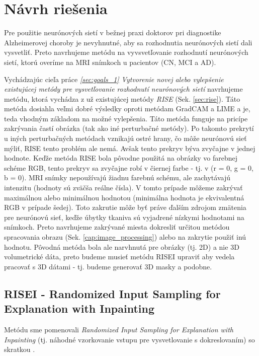 \chapter{Návrh riešenia}

Pre použitie neurónových sietí v bežnej praxi doktorov pri diagnostike Alzheimerovej choroby je nevyhnutné, aby sa rozhodnutia neurónových sietí dali vysvetliť. Preto navrhujeme metódu na vyvsvetľovanie rozhodnutí neurónových sietí, ktorú overíme na MRI snímkoch u pacientov (CN, MCI a AD).

Vychádzajúc cieľa práce \textit{\ref{sec:goals_1} Vytvorenie novej alebo vylepšenie existujúcej metódy pre vysvetľovanie rozhodnutí neurónových sietí} navrhujeme metódu, ktorá vychádza z už existujúcej metódy \textit{RISE} (Sek. \ref{sec:rise}). Táto metóda dosiahla veľmi dobré výsledky oproti metódam GradCAM a LIME a je, teda vhodným základom na možné vylepšenia. Táto metóda funguje na pricípe zakrývania častí obrázka (tak ako iné perturbačné metódy). Po takomto prekrytí u iných perturbačných metódach vznikajú ostré hrany, čo môže neurónovú sieť mýliť, RISE tento problém ale nemá. Avšak tento prekryv býva zvyčajne v jednej hodnote. Keďže metóda RISE bola pôvodne použitá na obrázky vo farebnej schéme RGB, tento prekryv sa zvyčajne robí v čiernej farbe - tj. v (r = 0, g = 0, b = 0). MRI snímky nepoužívajú žiadnu farebnú schému, ale zachytávajú intenzitu (hodnoty sú zväčša reálne čísla). V tomto prípade môžeme zakrývať maximálnou alebo minimálnou hodnotou (minimálna hodnota je ekvivalentná RGB v prípade šedej). Toto zakrutie môže byť práve ďalším zdrojom zmätenia pre neurónovú sieť, keďže úbytky tkaniva sú vyjadrené nízkymi hodnotami na snímkoch. Preto navrhujeme zakrývané miesta dokresliť určitou metódou spracovania obrazu (Sek. \ref{cap:image_processing}) alebo na zakrytie použiť inú hodnotu.
Pôvodná metóda bola ale narvhnutá pre obrázky (tj. 2D) a nie 3D volumetrické dáta, preto budeme musieť metódu RISEI upraviť aby vedela pracovať s 3D dátami - tj. budeme generovať 3D masky a podobne.

\section{RISEI - Randomized Input Sampling for Explanation with Inpainting \label{sec:risei}}

Metódu sme pomenovali \textit{Randomized Input Sampling for Explanation with Inpainting} (tj. náhodné vzorkovanie vstupu pre vysvetlovanie s dokreslovaním) so skratkou .

